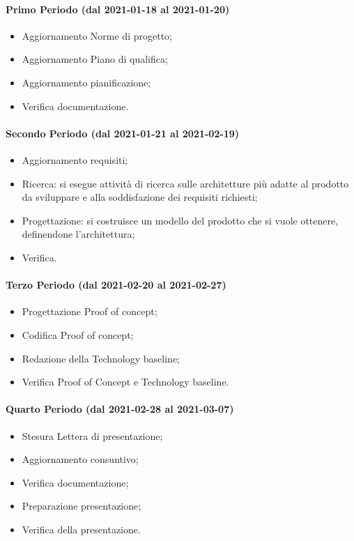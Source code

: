 \paragraph{Primo Periodo (dal 2021-01-18 al 2021-01-20)}
\begin{itemize}
	\item Aggiornamento Norme di progetto;
	\item Aggiornamento Piano di qualifica;
	\item Aggiornamento pianificazione;
	\item Verifica documentazione.
\end{itemize}

\paragraph{Secondo Periodo (dal 2021-01-21 al 2021-02-19)}
\begin{itemize}
	\item Aggiornamento requisiti;
	\item Ricerca: si esegue attività di ricerca sulle architetture più adatte al prodotto da sviluppare e alla soddisfazione dei requisiti richiesti;
	\item Progettazione: si costruisce un modello del prodotto che si vuole ottenere, definendone l'architettura;
	\item Verifica.
\end{itemize}

\paragraph{Terzo Periodo (dal 2021-02-20 al 2021-02-27)}
\begin{itemize}
	\item Progettazione Proof of concept;
	\item Codifica Proof of concept;
	\item Redazione della Technology baseline;
	\item Verifica Proof of Concept e Technology baseline.
\end{itemize}

\paragraph{Quarto Periodo (dal 2021-02-28 al 2021-03-07)}
\begin{itemize}
	\item Stesura Lettera di presentazione;
	\item Aggiornamento consuntivo;
	\item Verifica documentazione;
	\item Preparazione presentazione;
	\item Verifica della presentazione.
\end{itemize}

